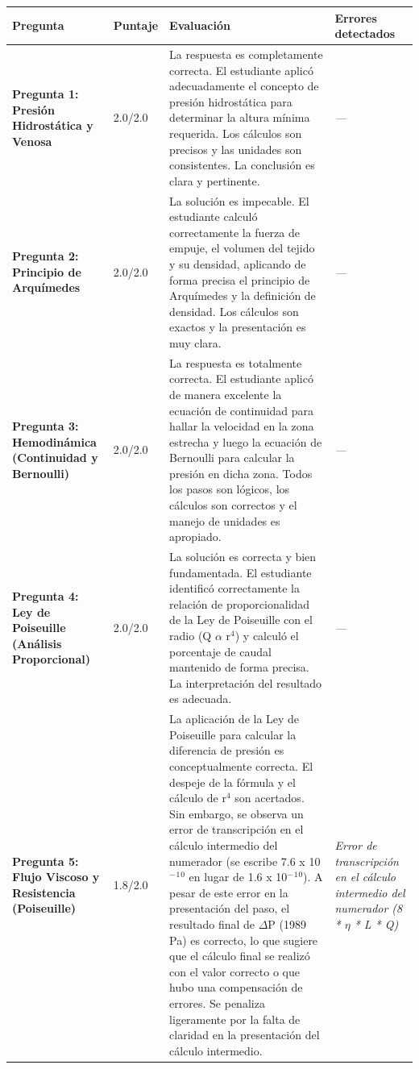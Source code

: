 \documentclass[11pt,a4paper]{article}
\begin{document}
\begin{longtable}{>{\bfseries}p{2.8cm} p{1.6cm} p{7.0cm} p{2.8cm}}
  \toprule
  \textbf{Pregunta} & \textbf{Puntaje} & \textbf{Evaluación} & \textbf{Errores detectados} \\
  \midrule
  \endhead
  \bottomrule
  \endfoot
    \textbf{Pregunta 1: Presión Hidrostática y Venosa} & 2.0/2.0 & La respuesta es completamente correcta. El estudiante aplicó adecuadamente el concepto de presión hidrostática para determinar la altura mínima requerida. Los cálculos son precisos y las unidades son consistentes. La conclusión es clara y pertinente. & \textit{---} \\
    \midrule
    \textbf{Pregunta 2: Principio de Arquímedes} & 2.0/2.0 & La solución es impecable. El estudiante calculó correctamente la fuerza de empuje, el volumen del tejido y su densidad, aplicando de forma precisa el principio de Arquímedes y la definición de densidad. Los cálculos son exactos y la presentación es muy clara. & \textit{---} \\
    \midrule
    \textbf{Pregunta 3: Hemodinámica (Continuidad y Bernoulli)} & 2.0/2.0 & La respuesta es totalmente correcta. El estudiante aplicó de manera excelente la ecuación de continuidad para hallar la velocidad en la zona estrecha y luego la ecuación de Bernoulli para calcular la presión en dicha zona. Todos los pasos son lógicos, los cálculos son correctos y el manejo de unidades es apropiado. & \textit{---} \\
    \midrule
    \textbf{Pregunta 4: Ley de Poiseuille (Análisis Proporcional)} & 2.0/2.0 & La solución es correcta y bien fundamentada. El estudiante identificó correctamente la relación de proporcionalidad de la Ley de Poiseuille con el radio (Q $\alpha$ r$^{4}$) y calculó el porcentaje de caudal mantenido de forma precisa. La interpretación del resultado es adecuada. & \textit{---} \\
    \midrule
    \textbf{Pregunta 5: Flujo Viscoso y Resistencia (Poiseuille)} & 1.8/2.0 & La aplicación de la Ley de Poiseuille para calcular la diferencia de presión es conceptualmente correcta. El despeje de la fórmula y el cálculo de r$^{4}$ son acertados. Sin embargo, se observa un error de transcripción en el cálculo intermedio del numerador (se escribe 7.6 x 10$^{-}$$^{1}$$^{0}$ en lugar de 1.6 x 10$^{-}$$^{1}$$^{0}$). A pesar de este error en la presentación del paso, el resultado final de $\Delta$P (1989 Pa) es correcto, lo que sugiere que el cálculo final se realizó con el valor correcto o que hubo una compensación de errores. Se penaliza ligeramente por la falta de claridad en la presentación del cálculo intermedio. & \textit{Error de transcripción en el cálculo intermedio del numerador (8 * $\eta$ * L * Q)} \\
    \midrule
\end{longtable}
\end{document}
